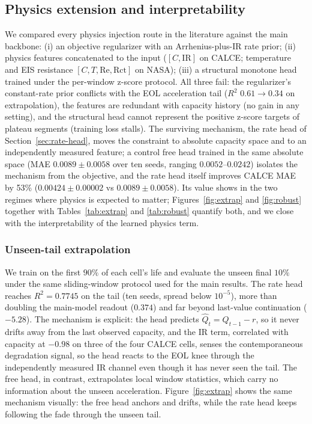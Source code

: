 \documentclass[final,5p,times,twocolumn]{elsarticle}
\begin{document}
\subsection{Physics extension and interpretability}
\label{sec:exp-phys}

We compared every physics injection route in the literature against
the main backbone: (i) an objective regularizer with an
Arrhenius-plus-IR rate prior; (ii) physics features concatenated to
the input ($[C,\mathrm{IR}]$ on CALCE; temperature and EIS
resistance $[C,T,\mathrm{Re},\mathrm{Rct}]$ on NASA); (iii) a
structural monotone head trained under the per-window z-score
protocol. All three fail: the regularizer's constant-rate prior
conflicts with the EOL acceleration tail ($R^2$ $0.61\to0.34$ on
extrapolation), the features are redundant with capacity history (no
gain in any setting), and the structural head cannot represent the
positive z-score targets of plateau segments (training loss stalls).
The surviving mechanism, the rate head of
Section~\ref{sec:rate-head}, moves the constraint to absolute
capacity space and to an independently measured feature; a control
free head trained in the same absolute space (MAE
$0.0089\pm0.0058$ over ten seeds, ranging $0.0052$--$0.0242$)
isolates the mechanism from the objective, and the rate head
itself improves CALCE MAE by 53\% ($0.00424\pm0.00002$ vs
$0.0089\pm0.0058$). Its value shows in the
two regimes where physics is expected to matter;
Figures~\ref{fig:extrap} and \ref{fig:robust} together with
Tables~\ref{tab:extrap} and \ref{tab:robust} quantify both, and we
close with the interpretability of the learned physics term.

\subsubsection{Unseen-tail extrapolation}

We train on the first $90\%$ of each cell's life and evaluate the
unseen final $10\%$ under the same sliding-window protocol used for
the main results. The rate head reaches $R^2 = 0.7745$ on the tail (ten
seeds, spread below $10^{-5}$), more than doubling the main-model readout
($0.374$) and far
beyond last-value continuation ($-5.28$). The mechanism is explicit:
the head predicts $\hat{Q}_t = Q_{t-1} - r$, so it never drifts
away from the last observed capacity, and the IR term, correlated
with capacity at $-0.98$ on three of the four CALCE cells, senses the
contemporaneous degradation signal, so the head reacts to the EOL
knee through the independently measured IR channel even though it
has never seen the tail. The free head, in contrast, extrapolates
local window statistics, which carry no information about the
unseen acceleration. Figure~\ref{fig:extrap} shows the same
mechanism visually: the free head anchors and drifts, while the
rate head keeps following the fade through the unseen tail.
\end{document}
